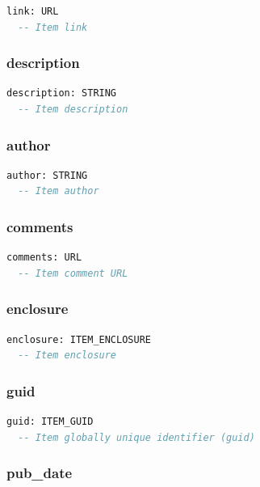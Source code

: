 \begin{lstlisting}[language=Eiffel]
link: URL
  -- Item link
\end{lstlisting}

\subsubsection{description}

\begin{lstlisting}[language=Eiffel]
description: STRING
  -- Item description
\end{lstlisting}

\subsubsection{author}

\begin{lstlisting}[language=Eiffel]
author: STRING
  -- Item author
\end{lstlisting}

\subsubsection{comments}

\begin{lstlisting}[language=Eiffel]
comments: URL
  -- Item comment URL
\end{lstlisting}

\subsubsection{enclosure}

\begin{lstlisting}[language=Eiffel]
enclosure: ITEM_ENCLOSURE
  -- Item enclosure
\end{lstlisting}

\subsubsection{guid}

\begin{lstlisting}[language=Eiffel]
guid: ITEM_GUID
  -- Item globally unique identifier (guid)
\end{lstlisting}

\subsubsection{pub\_date}

